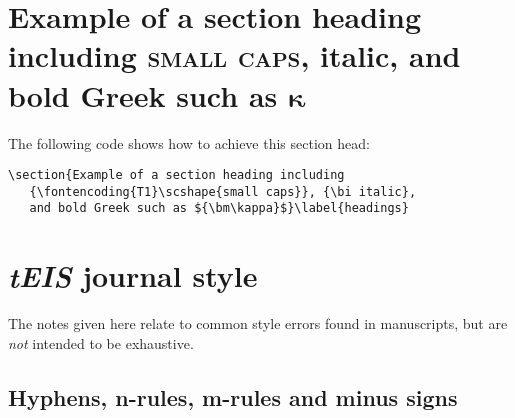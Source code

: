 \documentclass[]{tEIS2e}
\theoremstyle{plain}
\theoremstyle{remark}
\begin{document}
\section{Example of a section heading including
   {\scshape{small caps}}, {\bi italic},
   and bold Greek such as ${\bm\kappa}$}\label{headings}

%
The following code shows how to achieve this section head:
%
\begin{verbatim}
\section{Example of a section heading including
   {\fontencoding{T1}\scshape{small caps}}, {\bi italic},
   and bold Greek such as ${\bm\kappa}$}\label{headings}
\end{verbatim}
%
%

\section{{\textit{tEIS}} journal style}

The notes given here relate to common style errors found in manuscripts, but are {\itshape not\/}
intended to be exhaustive.


\subsection{Hyphens, n-rules, m-rules and minus signs}\label{dashes}
\end{document}
